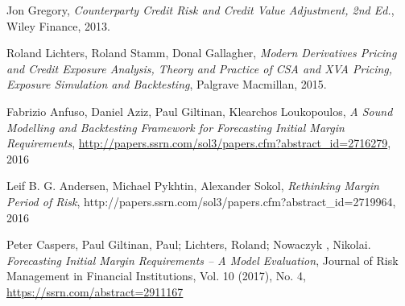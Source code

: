 \documentclass[12pt, a4paper]{article}
\begin{document}
\begin{thebibliography}{*}
 Jon Gregory, {\em Counterparty Credit Risk and Credit Value Adjustment, 2nd Ed.}, Wiley Finance,
  2013.

 Roland Lichters, Roland Stamm, Donal Gallagher, {\em Modern Derivatives Pricing and Credit Exposure
    Analysis, Theory and Practice of CSA and XVA Pricing, Exposure Simulation and Backtesting}, Palgrave Macmillan,
  2015.

 Fabrizio Anfuso, Daniel Aziz, Paul Giltinan, Klearchos Loukopoulos, {\em A Sound Modelling and
    Backtesting Framework for Forecasting Initial Margin Requirements},
  \url{http://papers.ssrn.com/sol3/papers.cfm?abstract_id=2716279}, 2016

 Leif B. G. Andersen, Michael Pykhtin, Alexander Sokol, {\em Rethinking Margin Period of Risk},
  http://papers.ssrn.com/sol3/papers.cfm?abstract\_id=2719964, 2016




 Peter Caspers, Paul Giltinan, Paul; Lichters, Roland; Nowaczyk , Nikolai. {\em Forecasting Initial Margin Requirements – A Model Evaluation}, Journal of Risk Management in Financial Institutions, Vol. 10 (2017), No. 4, \url{https://ssrn.com/abstract=2911167}

\end{thebibliography}

\newpage
{}
\listoftodos[Todo]
\end{document}
